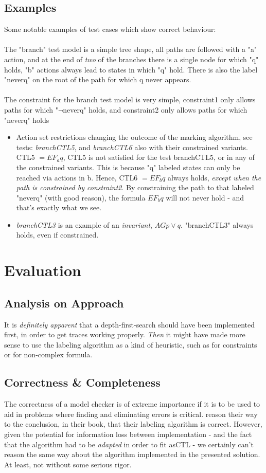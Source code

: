 \documentclass[]{article}
\begin{document}
\subsection{Examples}
Some notable examples of test cases which show correct behaviour:
\\\\
The "branch" test model is a simple tree shape, all paths are followed with a "a" action, and at the end of \emph{two} of the branches there is a single node for which "q" holds, "b" actions always lead to states in which "q" hold. There is also the label "neverq" on the root of the path for which q never appears.
\\\\
The constraint for the branch test model is very simple, constraint1 only allows paths for which "$\lnot$neverq" holds, and constraint2 only allows paths for which "neverq" holds

\begin{itemize}
	\item Action set restrictions changing the outcome of the marking algorithm, see tests: \emph{branchCTL5}, and \emph{branchCTL6} also with their constrained variants. CTL5 $ = EF_a q$, CTL5 is not satisfied for the test branchCTL5, or in any of the constrained variants. This is because "q" labeled states can only be reached via actions in b. Hence, CTL6 $ = EF_b q$ always holds, \emph{except when the path is constrained by constraint2}. By constraining the path to that labeled "neverq" (with good reason), the formula $EF_b q$ will not never hold - and that's exactly what we see.
    \item \emph{branchCTL3} is an example of an \emph{invariant}, $AG p \lor q$. "branchCTL3" always holds, even if constrained.
\end{itemize}

\section{Evaluation}\label{sec:evaluation}
\subsection{Analysis on Approach}
It is \emph{definitely apparent} that a depth-first-search should have been implemented first, in order to get traces working properly. \emph{Then} it might have made more sense to use the labeling algorithm as a kind of heuristic, such as for constraints or for non-complex formula.
\subsection{Correctness \& Completeness}
The correctness of a model checker is of extreme importance if it is to be used to aid in problems where finding and eliminating errors is critical. \citeauthor{Berard:2010:SSV:1965314} reason their way to the conclusion, in their book, that their labeling algorithm is correct. However, given the potential for information loss between implementation - and the fact that the algorithm had to be \emph{adapted} in order to fit asCTL - we certainly can't reason the same way about the algorithm implemented in the presented solution. At least, not without some serious rigor.
\end{document}
